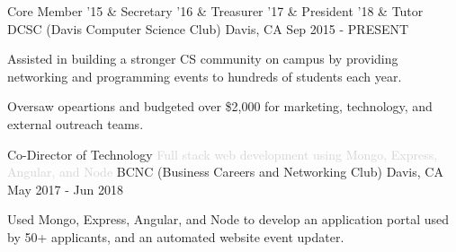 

\begin{cventries}

  \cventry
  {Core Member '15 \& Secretary '16 \& Treasurer '17 \& President '18 \& Tutor} %
  {DCSC (Davis Computer Science Club)} %
  {Davis, CA} %
  {Sep 2015 - PRESENT} %
  {
    \begin{cvitems} %
      \item {Assisted in building a stronger CS community on campus by providing networking and programming events to hundreds of students each year.}
      \item {Oversaw opeartions and budgeted over \$2,000 for marketing, technology, and external outreach teams.}
    \end{cvitems}
  }

  \cventry
  {Co-Director of Technology \textcolor{lightgray}{Full stack web development using Mongo, Express, Angular, and Node}} %
  {BCNC (Business Careers and Networking Club)} %
  {Davis, CA} %
  {May 2017 - Jun 2018} %
  {
    \begin{cvitems} %
      \item {Used Mongo, Express, Angular, and Node to develop an application portal used by 50+ applicants, and an automated website event updater.}
    \end{cvitems}
  }
\end{cventries}
